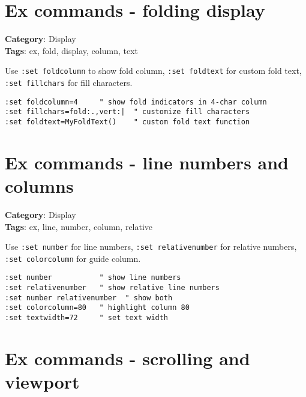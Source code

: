 {{{\section{Ex commands - folding display}

\textbf{Category}: Display\\ \textbf{Tags}: ex, fold, display, column, text
\vspace{0.5cm}

Use {\footnotesize \Verb§:set foldcolumn§} to show fold column, {\footnotesize \Verb§:set foldtext§} for custom fold text, {\footnotesize \Verb§:set fillchars§} for fill characters.

\begin{Exa*}{}
\begin{Verbatim}[fontsize=\footnotesize, breaklines, breakanywhere]
:set foldcolumn=4     " show fold indicators in 4-char column
:set fillchars=fold:.,vert:|  " customize fill characters
:set foldtext=MyFoldText()    " custom fold text function
\end{Verbatim}
\end{Exa*}

\section{Ex commands - line numbers and columns}

\textbf{Category}: Display\\ \textbf{Tags}: ex, line, number, column, relative
\vspace{0.5cm}

Use {\footnotesize \Verb§:set number§} for line numbers, {\footnotesize \Verb§:set relativenumber§} for relative numbers, {\footnotesize \Verb§:set colorcolumn§} for guide column.

\begin{Exa*}{}
\begin{Verbatim}[fontsize=\footnotesize, breaklines, breakanywhere]
:set number           " show line numbers
:set relativenumber   " show relative line numbers
:set number relativenumber  " show both
:set colorcolumn=80   " highlight column 80
:set textwidth=72     " set text width
\end{Verbatim}
\end{Exa*}

\section{Ex commands - scrolling and viewport}

}}}
